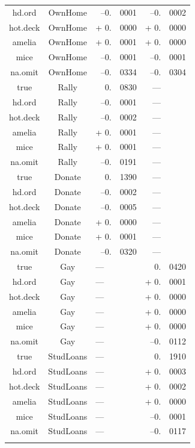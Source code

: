 \documentclass[12pt,econ]{sources/authesis}
\begin{document}
\begin{longtable}{ccr@{}lr@{}l}
 hd.ord & OwnHome & --0.&0001 & --0.&0002 \\ 
 hot.deck & OwnHome & + 0.&0000 & + 0.&0000 \\ 
 amelia & OwnHome & + 0.&0001 & + 0.&0000 \\ 
 mice & OwnHome & --0.&0001 & --0.&0001 \\
 na.omit & OwnHome & --0.&0334 & --0.&0304 \\
 true & Rally & 0.&0830 & --- \\
 hd.ord & Rally & --0.&0001 & --- \\ 
 hot.deck & Rally & --0.&0002 & --- \\ 
 amelia & Rally & + 0.&0001 & --- \\ 
 mice & Rally & + 0.&0001 & --- \\ 
 na.omit & Rally & --0.&0191 & --- \\ 
 true & Donate & 0.&1390 & --- \\ 
 hd.ord & Donate & --0.&0002 & --- \\ 
 hot.deck & Donate & --0.&0005 & --- \\
 amelia & Donate & + 0.&0000 & --- \\ 
 mice & Donate & + 0.&0001 & --- \\ 
 na.omit & Donate & --0.&0320 & --- \\ 
 true & Gay & \multicolumn{2}{l}{---} & 0.&0420 \\ 
 hd.ord & Gay & \multicolumn{2}{l}{---}  & + 0.&0001 \\
 hot.deck & Gay & \multicolumn{2}{l}{---} & + 0.&0000 \\ 
 amelia & Gay & \multicolumn{2}{l}{---} & + 0.&0000 \\
 mice & Gay & \multicolumn{2}{l}{---} & + 0.&0000 \\
 na.omit & Gay & \multicolumn{2}{l}{---} &  --0.&0112 \\
 true & StudLoans & \multicolumn{2}{l}{---} & 0.&1910 \\
 hd.ord & StudLoans & \multicolumn{2}{l}{---} & + 0.&0003 \\
 hot.deck & StudLoans & \multicolumn{2}{l}{---} & + 0.&0002 \\
 amelia & StudLoans & \multicolumn{2}{l}{---} & + 0.&0000 \\
 mice & StudLoans & \multicolumn{2}{l}{---} & --0.&0001 \\
 na.omit & StudLoans & \multicolumn{2}{l}{---} & --0.&0117 \\ 
 \hline \\[-1.8ex]
 \end{longtable}
\dsp
\end{document}
